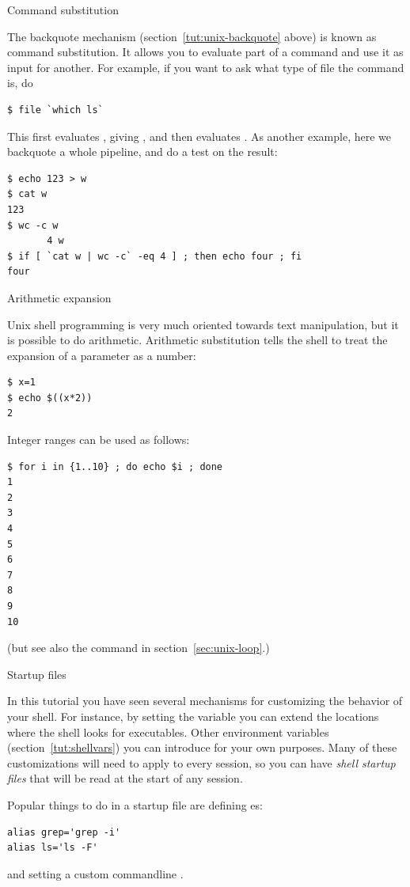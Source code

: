  {Command substitution}

The backquote mechanism (section~\ref{tut:unix-backquote} above)
is known as command substitution. It allows you to evaluate part
of a command and use it as input for another. For example,
if you want to ask what type of file the command  is, do
\begin{lstlisting}
$ file `which ls`
\end{lstlisting}
This first evaluates , giving , and then
evaluates . As another example, here
we backquote a whole pipeline, and do a test on the result:
\begin{lstlisting}
$ echo 123 > w
$ cat w
123
$ wc -c w
       4 w
$ if [ `cat w | wc -c` -eq 4 ] ; then echo four ; fi
four
\end{lstlisting}

 {Arithmetic expansion}
\label{sec:arith-expansion}

Unix shell programming is very much oriented towards text manipulation, but it 
is possible to do arithmetic. 
Arithmetic substitution tells the shell to treat the expansion of a
parameter as a number:
\begin{lstlisting}
$ x=1
$ echo $((x*2))
2
\end{lstlisting}

Integer ranges can be used as follows:
\begin{lstlisting}
$ for i in {1..10} ; do echo $i ; done
1
2
3
4
5
6
7
8
9
10
\end{lstlisting}
(but see also the  command in section~\ref{sec:unix-loop}.)

 {Startup files}

In this tutorial you have seen several mechanisms for customizing
the behavior of your shell. For instance, by setting the 
variable you can extend the locations where the shell looks for executables.
Other environment variables (section~\ref{tut:shellvars}) you can
introduce for your own purposes. Many of these customizations will
need to apply to every session, so you can have 
\emph{shell startup files} that will be read at the start of any session.

Popular things to do in a startup file are defining es:
\begin{lstlisting}
alias grep='grep -i'
alias ls='ls -F'
\end{lstlisting}
and setting a custom commandline .

